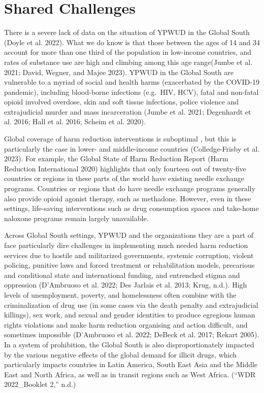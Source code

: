 \documentclass[
  letterpaper,
  DIV=11,
  numbers=noendperiod]{scrartcl}
\begin{document}
\section{Shared Challenges}\label{sec-challenges}

There is a severe lack of data on the situation of YPWUD in the Global
South (Doyle et al. 2022). What we do know is that those between the
ages of 14 and 34 account for more than one third of the population in
low-income countries, and rates of substance use are high and climbing
among this age range(Jumbe et al. 2021; David, Wegner, and Majee 2023).
YPWUD in the Global South are vulnerable to a myriad of social and
health harms (exacerbated by the COVID-19 pandemic), including
blood-borne infections (e.g.~HIV, HCV), fatal and non-fatal opioid
involved overdose, skin and soft tissue infections, police violence and
extrajudicial murder and mass incarceration (Jumbe et al. 2021;
Degenhardt et al. 2016; Hall et al. 2016; Scheim et al. 2020).

Global coverage of harm reduction interventions is suboptimal , but this
is particularly the case in lower- and middle-income countries
(Colledge-Frisby et al. 2023). For example, the Global State of Harm
Reduction Report (Harm Reduction International 2020) highlights that
only fourteen out of twenty-five countries or regions in these parts of
the world have existing needle exchange programs. Countries or regions
that do have needle exchange programs generally also provide opioid
agonist therapy, such as methadone. However, even in these settings,
life-saving interventions such as drug consumption spaces and take-home
naloxone programs remain largely unavailable.

Across Global South settings, YPWUD and the organizations they are a
part of face particularly dire challenges in implementing much needed
harm reduction services due to hostile and militarized governments,
systemic corruption, violent policing, punitive laws and forced
treatment or rehabilitation models, precarious and conditional state and
international funding, and entrenched stigma and oppression (D'Ambruoso
et al. 2022; Des Jarlais et al. 2013; Krug, n.d.). High levels of
unemployment, poverty, and homelessness often combine with the
criminalization of drug use (in some cases via the death penalty and
extrajudicial killings), sex work, and sexual and gender identities to
produce egregious human rights violations and make harm reduction
organising and action difficult, and sometimes impossible (D'Ambruoso et
al. 2022; DeBeck et al. 2017; Rekart 2005). In a system of prohibition,
the Global South is also disproportionately impacted by the various
negative effects of the global demand for illicit drugs, which
particularly impacts countries in Latin America, South East Asia and the
Middle East and North Africa, as well as in transit regions such as West
Africa. ({``WDR 2022{\_}Booklet 2,''} n.d.)
\end{document}
